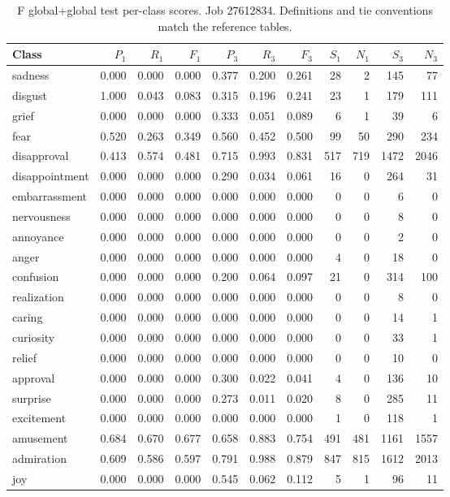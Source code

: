 \begin{table}[!htbp]
\centering
\scriptsize
\setlength{\tabcolsep}{5pt}
\begin{tabular}{lrrrrrrrrrr}
\toprule
Class & $P_1$ & $R_1$ & $F_1$ & $P_3$ & $R_3$ & $F_3$ & $S_1$ & $N_1$ & $S_3$ & $N_3$ \\
\midrule
sadness & 0.000 & 0.000 & 0.000 & 0.377 & 0.200 & 0.261 & 28 & 2 & 145 & 77 \\
disgust & 1.000 & 0.043 & 0.083 & 0.315 & 0.196 & 0.241 & 23 & 1 & 179 & 111 \\
grief & 0.000 & 0.000 & 0.000 & 0.333 & 0.051 & 0.089 & 6 & 1 & 39 & 6 \\
fear & 0.520 & 0.263 & 0.349 & 0.560 & 0.452 & 0.500 & 99 & 50 & 290 & 234 \\
disapproval & 0.413 & 0.574 & 0.481 & 0.715 & 0.993 & 0.831 & 517 & 719 & 1472 & 2046 \\
disappointment & 0.000 & 0.000 & 0.000 & 0.290 & 0.034 & 0.061 & 16 & 0 & 264 & 31 \\
embarrassment & 0.000 & 0.000 & 0.000 & 0.000 & 0.000 & 0.000 & 0 & 0 & 6 & 0 \\
nervousness & 0.000 & 0.000 & 0.000 & 0.000 & 0.000 & 0.000 & 0 & 0 & 8 & 0 \\
annoyance & 0.000 & 0.000 & 0.000 & 0.000 & 0.000 & 0.000 & 0 & 0 & 2 & 0 \\
anger & 0.000 & 0.000 & 0.000 & 0.000 & 0.000 & 0.000 & 4 & 0 & 18 & 0 \\
confusion & 0.000 & 0.000 & 0.000 & 0.200 & 0.064 & 0.097 & 21 & 0 & 314 & 100 \\
realization & 0.000 & 0.000 & 0.000 & 0.000 & 0.000 & 0.000 & 0 & 0 & 8 & 0 \\
caring & 0.000 & 0.000 & 0.000 & 0.000 & 0.000 & 0.000 & 0 & 0 & 14 & 1 \\
curiosity & 0.000 & 0.000 & 0.000 & 0.000 & 0.000 & 0.000 & 0 & 0 & 33 & 1 \\
relief & 0.000 & 0.000 & 0.000 & 0.000 & 0.000 & 0.000 & 0 & 0 & 10 & 0 \\
approval & 0.000 & 0.000 & 0.000 & 0.300 & 0.022 & 0.041 & 4 & 0 & 136 & 10 \\
surprise & 0.000 & 0.000 & 0.000 & 0.273 & 0.011 & 0.020 & 8 & 0 & 285 & 11 \\
excitement & 0.000 & 0.000 & 0.000 & 0.000 & 0.000 & 0.000 & 1 & 0 & 118 & 1 \\
amusement & 0.684 & 0.670 & 0.677 & 0.658 & 0.883 & 0.754 & 491 & 481 & 1161 & 1557 \\
admiration & 0.609 & 0.586 & 0.597 & 0.791 & 0.988 & 0.879 & 847 & 815 & 1612 & 2013 \\
joy & 0.000 & 0.000 & 0.000 & 0.545 & 0.062 & 0.112 & 5 & 1 & 96 & 11 \\
\bottomrule
\end{tabular}
\caption{F global+global test per-class scores. Job 27612834. Definitions and tie conventions match the reference tables.}
\label{tab:classes-f_global_control}
\end{table}
